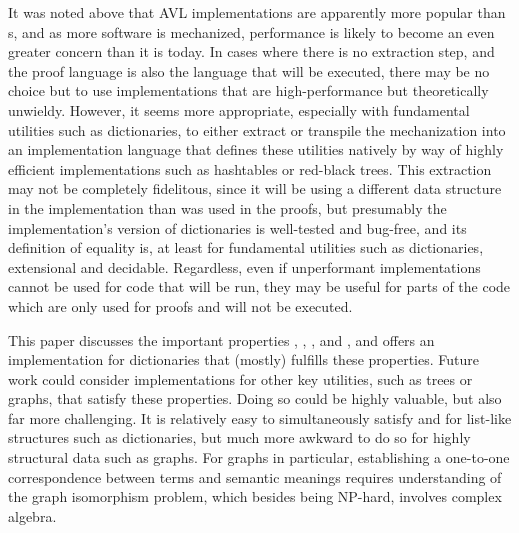 It was noted above that AVL implementations are apparently more popular than {\CAL}s, and as more software is mechanized, performance is likely to become an
%
even greater concern than it is today. In cases where there is no extraction step, and the proof language is also the language that will be executed,
%
there may be no choice but to use implementations that are high-performance but theoretically unwieldy. However, it seems more appropriate, especially with
%
fundamental utilities such as dictionaries, to either extract or transpile the mechanization into an implementation language that defines these utilities natively
%
by way of highly efficient implementations such as hashtables or red-black trees. This extraction may not be completely fidelitous, since it will be using a
%
different data structure in the implementation than was used in the proofs, but presumably the implementation's version of dictionaries is well-tested and bug-free,
%
and its definition of equality is, at least for fundamental utilities such as dictionaries, extensional and decidable. Regardless, even if unperformant implementations
%
cannot be used for code that will be run, they may be useful for parts of the code which are only used for proofs and will not be executed.


This paper discusses the important properties \SemTot, \SemInj, \EqDec, and \EzDstr, and offers an implementation for dictionaries that (mostly) fulfills these properties.
%
Future work could consider implementations for other key utilities, such as trees or graphs, that satisfy these properties. Doing so could be highly valuable,
%
but also far more challenging. It is relatively easy to simultaneously satisfy \SemTot{} and \SemInj{} for list-like structures such as dictionaries,
%
but much more awkward to do so for highly structural data such as graphs. For graphs in particular, establishing a one-to-one correspondence between terms and
%
semantic meanings requires understanding of the graph isomorphism problem, which besides being NP-hard, involves complex algebra.

